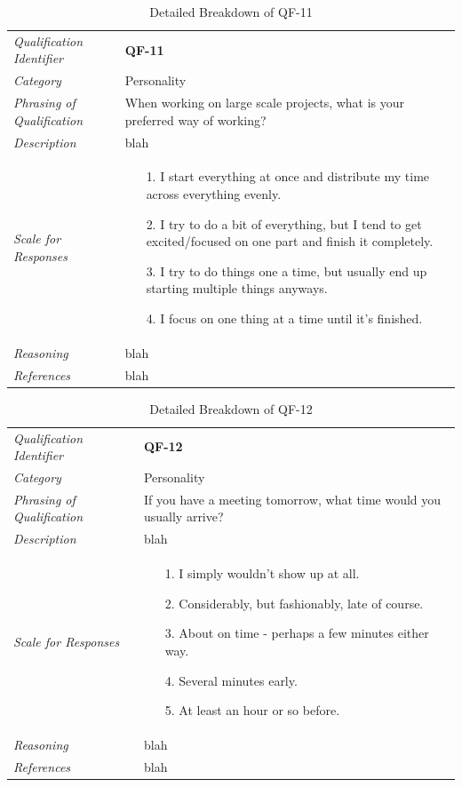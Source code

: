 \documentclass[12pt,letterpaper]{article}
\begin{document}
\begin{table}[H]
	\caption{Detailed Breakdown of QF-11}
	\begin{tabu} to 
		\toprule
		Qualification Identifier & {\bf QF-11}\\
		Category & Personality \\
		Phrasing of Qualification & When working on large scale projects, what is your preferred way of working? \\
		Description & blah\\
		Scale for Responses &
		\begin{minipage}[t]{\linewidth}
			\begin{enumerate}
				\item[1.] I start everything at once and distribute my time across everything evenly.
				\item[2.] I try to do a bit of everything, but I tend to get excited/focused on one part and finish it completely.
				\item[3.] I try to do things one a time, but usually end up starting multiple things anyways.
				\item[4.] I focus on one thing at a time until it's finished.
			\end{enumerate}
		\end{minipage}\\
		Reasoning & blah\\
		References & blah\\
		\toprule
	\end{tabu}
\end{table}

\begin{table}[H]
	\caption{Detailed Breakdown of QF-12}
	\begin{tabu} to 
		\toprule
		Qualification Identifier & {\bf QF-12}\\
		Category & Personality \\
		Phrasing of Qualification & If you have a meeting tomorrow, what time would you usually arrive? \\
		Description & blah\\
		Scale for Responses &
		\begin{minipage}[t]{\linewidth}
			\begin{enumerate}
				\item[1.] I simply wouldn't show up at all.
				\item[2.] Considerably, but fashionably, late of course.
				\item[3.] About on time - perhaps a few minutes either way.
				\item[4.] Several minutes early.
				\item[5.] At least an hour or so before.
			\end{enumerate}
		\end{minipage}\\
		Reasoning & blah\\
		References & blah\\
		\toprule
	\end{tabu}
\end{table}
\end{document}
